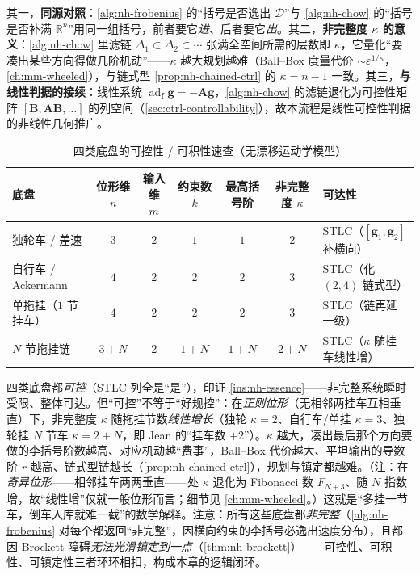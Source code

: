 \begin{insight}[读这两段流程的三个要点]\label{ins:nh-quickguide-read}
其一，\textbf{同源对照}：\cref{alg:nh-frobenius} 的“括号是否逸出 $\mathcal{D}$”与 \cref{alg:nh-chow} 的“括号是否补满 $\mathbb{R}^n$”用同一组括号，前者要它\emph{进}、后者要它\emph{出}。其二，\textbf{非完整度 $\kappa$ 的意义}：\cref{alg:nh-chow} 里滤链 $\Delta_1\subset\Delta_2\subset\cdots$ 张满全空间所需的层数即 $\kappa$，它量化“要凑出某些方向得做几阶机动”——$\kappa$ 越大规划越难（Ball--Box 度量代价 $\sim\varepsilon^{1/\kappa}$，\cref{ch:mm-wheeled}），与链式型 \cref{prop:nh-chained-ctrl} 的 $\kappa=n-1$ 一致。其三，\textbf{与线性判据的接续}：线性系统 $\operatorname{ad}_{\mathbf{f}}\mathbf{g}=-\mathbf{A}\mathbf{g}$，\cref{alg:nh-chow} 的滤链退化为可控性矩阵 $[\mathbf{B},\mathbf{A}\mathbf{B},\dots]$ 的列空间（\cref{sec:ctrl-controllability}），故本流程是线性可控性判据的非线性几何推广。
\end{insight}

\begin{table}[H]\centering\small
\caption{四类底盘的可控性 / 可积性速查（无漂移运动学模型）}
\label{tab:nh-chassis-rank}
\begin{tabular}{lcccccl}
\toprule
底盘 & 位形维 $n$ & 输入维 $m$ & 约束数 $k$ & 最高括号阶 & 非完整度 $\kappa$ & 可达性 \\
\midrule
独轮车 / 差速 & $3$ & $2$ & $1$ & $1$ & $2$ & STLC（$[\mathbf{g}_1,\mathbf{g}_2]$ 补横向） \\
自行车 / Ackermann & $4$ & $2$ & $2$ & $2$ & $3$ & STLC（化 $(2,4)$ 链式型） \\
单拖挂（$1$ 节挂车） & $4$ & $2$ & $2$ & $2$ & $3$ & STLC（链再延一级） \\
$N$ 节拖挂链 & $3{+}N$ & $2$ & $1{+}N$ & $1{+}N$ & $2{+}N$ & STLC（$\kappa$ 随挂车线性增） \\
\bottomrule
\end{tabular}
\end{table}

\begin{insight}\label{ins:nh-chassis-read}
四类底盘都\emph{可控}（STLC 列全是“是”），印证 \cref{ins:nh-essence}——非完整系统瞬时受限、整体可达。但“可控”不等于“好规控”：在\emph{正则位形}（无相邻两挂车互相垂直）下，非完整度 $\kappa$ 随拖挂节数\emph{线性增长}（独轮 $\kappa=2$、自行车/单挂 $\kappa=3$、独轮挂 $N$ 节车 $\kappa=2+N$，即 Jean 的“挂车数 $+2$”）。$\kappa$ 越大，凑出最后那个方向要做的李括号阶数越高、对应机动越“费事”，Ball--Box 代价越大、平坦输出的导数阶 $r$ 越高、链式型链越长（\cref{prop:nh-chained-ctrl}），规划与镇定都越难。（注：在\emph{奇异位形}——相邻挂车两两垂直——处 $\kappa$ 退化为 Fibonacci 数 $F_{N+3}$、随 $N$ 指数增，故“线性增”仅就一般位形而言；细节见 \cref{ch:mm-wheeled}。）这就是“多挂一节车，倒车入库就难一截”的数学解释。注意：所有这些底盘都\emph{非完整}（\cref{alg:nh-frobenius} 对每个都返回“非完整”，因横向约束的李括号必逸出速度分布），且都因 Brockett 障碍\emph{无法光滑镇定到一点}（\cref{thm:nh-brockett}）——可控性、可积性、可镇定性三者环环相扣，构成本章的逻辑闭环。
\end{insight}


